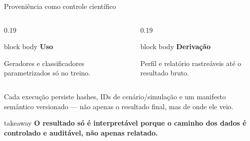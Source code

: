 \begin{frame}{Proveniência como controle científico}
\begin{columns}[T,onlytextwidth]
\begin{column}{0.19\textwidth}
\begin{beamercolorbox}[wd=\linewidth,sep=.11cm,rounded=true]{block body}
        {\sffamily\bfseries\fontsize{8.8}{10.4}\selectfont\color{CoInfoBlue}Uso}\par\vspace{.04cm}
        {\fontsize{7.7}{9.2}\selectfont Geradores e classificadores parametrizados só no treino.}
      \end{beamercolorbox}
    \end{column}
    \begin{column}{0.19\textwidth}
      \begin{beamercolorbox}[wd=\linewidth,sep=.11cm,rounded=true]{block body}
        {\sffamily\bfseries\fontsize{8.8}{10.4}\selectfont\color{CoInfoBlue}Derivação}\par\vspace{.04cm}
        {\fontsize{7.7}{9.2}\selectfont Perfil e relatório rastreáveis até o resultado bruto.}
      \end{beamercolorbox}
    \end{column}
  \end{columns}

  \vspace{.11cm}
  {\centering\sffamily\fontsize{8.6}{10.3}\selectfont\color{CoInfoGray}
    Cada execução persiste hashes, IDs de cenário/simulação e um manifesto semântico versionado --- não apenas o resultado final, mas de onde ele veio.\par}

  \vspace{.09cm}
  \begin{beamercolorbox}[wd=\linewidth,sep=.12cm,rounded=true]{takeaway}
    \centering\sffamily\bfseries\fontsize{10.2}{12.1}\selectfont
    O resultado só é interpretável porque o caminho dos dados é controlado e auditável, não apenas relatado.
  \end{beamercolorbox}


\end{frame}
